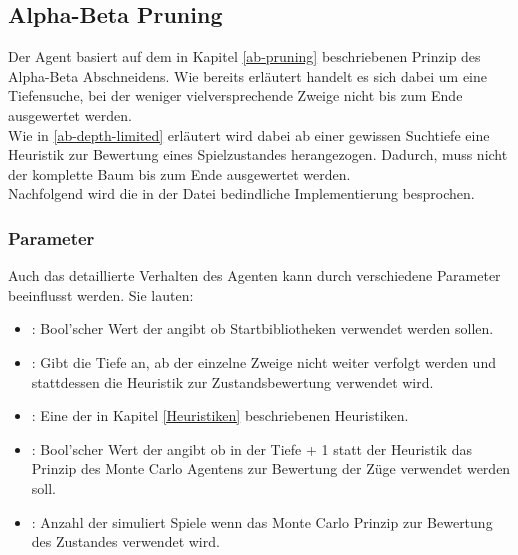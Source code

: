 \subsection{Alpha-Beta Pruning}
Der Agent  basiert auf dem in Kapitel \ref{ab-pruning} beschriebenen Prinzip des Alpha-Beta Abschneidens. Wie bereits erläutert handelt es sich dabei um eine Tiefensuche, bei der weniger vielversprechende Zweige nicht bis zum Ende ausgewertet werden.
\\Wie in \ref{ab-depth-limited} erläutert wird dabei ab einer gewissen Suchtiefe eine Heuristik zur Bewertung eines Spielzustandes herangezogen. Dadurch, muss nicht der komplette Baum bis zum Ende ausgewertet werden.  
\\Nachfolgend wird die in der Datei  bedindliche Implementierung besprochen.
\subsubsection{Parameter}
Auch das detaillierte Verhalten des Agenten  kann durch verschiedene Parameter beeinflusst werden. Sie lauten:
\begin{itemize}
\item {}: Bool'scher Wert der angibt ob Startbibliotheken verwendet werden sollen.
\item {}: Gibt die Tiefe an, ab der einzelne Zweige nicht weiter verfolgt werden und stattdessen die Heuristik zur Zustandsbewertung verwendet wird.
\item {}: Eine der in Kapitel \ref{Heuristiken} beschriebenen Heuristiken.
\item {}: Bool'scher Wert der angibt ob in der Tiefe  + 1 statt der Heuristik das Prinzip des Monte Carlo Agentens zur Bewertung der Züge verwendet werden soll.
\item {}: Anzahl der simuliert Spiele wenn das Monte Carlo Prinzip zur Bewertung des Zustandes verwendet wird.
\end{itemize}
